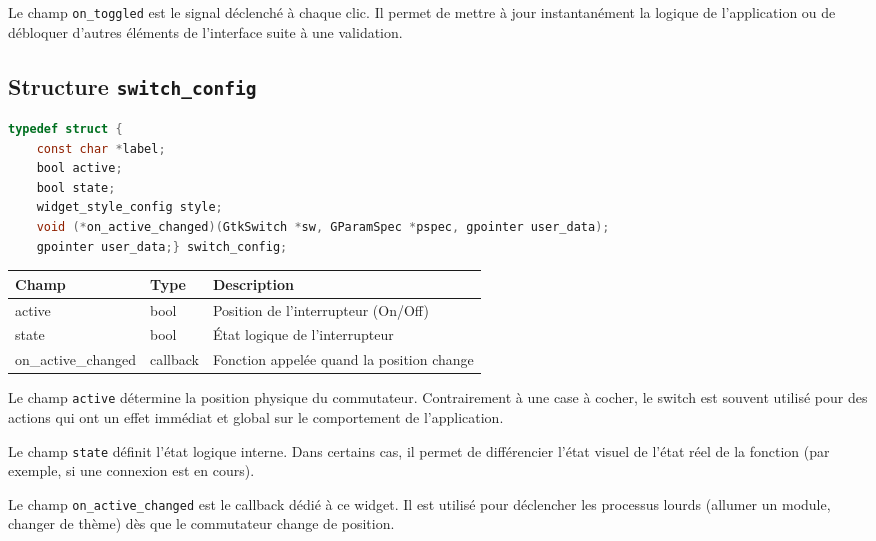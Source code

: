 Le champ \texttt{on\_toggled} est le signal déclenché à chaque clic. Il permet de mettre à jour instantanément la logique de l'application ou de débloquer d'autres éléments de l'interface suite à une validation.

\subsection{Structure \texttt{switch\_config}}
\begin{lstlisting}[language=C]
typedef struct {
    const char *label;
    bool active;
    bool state;
    widget_style_config style;
    void (*on_active_changed)(GtkSwitch *sw, GParamSpec *pspec, gpointer user_data);
    gpointer user_data;} switch_config;
\end{lstlisting}

\begin{center}
\begin{tabular}{|l|l|>{\raggedright\arraybackslash}p{6cm}|}
\hline
\textbf{Champ} & \textbf{Type} & \textbf{Description} \\
\hline
active & bool & Position de l'interrupteur (On/Off) \\
\hline
state & bool & État logique de l'interrupteur \\
\hline
on\_active\_changed & callback & Fonction appelée quand la position change \\
\hline
\end{tabular}
\end{center}

\bigskip

Le champ \texttt{active} détermine la position physique du commutateur. Contrairement à une case à cocher, le switch est souvent utilisé pour des actions qui ont un effet immédiat et global sur le comportement de l'application.

Le champ \texttt{state} définit l'état logique interne. Dans certains cas, il permet de différencier l'état visuel de l'état réel de la fonction (par exemple, si une connexion est en cours).

Le champ \texttt{on\_active\_changed} est le callback dédié à ce widget. Il est utilisé pour déclencher les processus lourds (allumer un module, changer de thème) dès que le commutateur change de position.